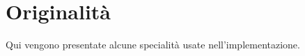 \chapter{Originalità\label{sec:originalita}}
\noindent Qui vengono presentate alcune specialità usate nell'implementazione.